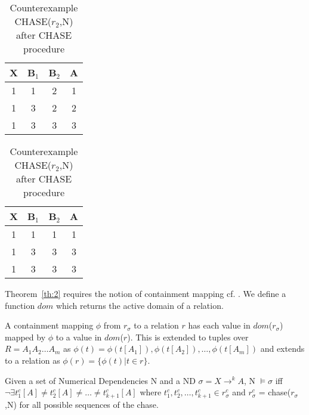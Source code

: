 {\line
\begin{table}[ht]
\begin{minipage}[b]{7cm}
\begin{center}
\begin{tabular}{|c|c|c|c|} \hline
 {\bf X} & {\bf B$_1$} & {\bf B$_2$} & {\bf A} \\\hline
 1 & 1 & 2 & 1 \\ 
 1 & 3 & 2 & 2 \\ 
 1 & 3 & 3 & 3 \\ \hline
\end{tabular}
\end{center}
\caption{\label{tbl:NDchase2}Example CHASE($r_1$,N) after CHASE procedure} 
\end{minipage}
\hfill
\begin{minipage}[b]{7cm}
\begin{center}
\begin{tabular}{|c|c|c|c|} \hline
 {\bf X} & {\bf B$_1$} & {\bf B$_2$} & {\bf A} \\\hline
 1 & 1 & 1 & 1 \\ 
 1 & 3 & 3 & 3 \\ 
 1 & 3 & 3 & 3 \\ \hline
\end{tabular}
\end{center}
\caption{\label{tbl:NDchase4}Counterexample CHASE($r_2$,N) after CHASE procedure } 
\end{minipage}
\end{table}
}


Theorem~\ref{th:2} requires the notion of containment mapping
cf. \cite{atze93}.  We define a function $dom$ which
returns the active domain of a relation.

\begin{definition}\label{def:cm}
\begin{rm}
A containment mapping $\phi$ from $r_\sigma$ to a relation $r$ has
each value in $dom$($r_\sigma$) mapped by $\phi$ to a value in $dom$($r$).
This is extended to tuples over $R = A_1A_2 \ldots A_m$ as $\phi(t) =
\phi(t[A_1]),\phi(t[A_2]),\ldots, \phi(t[A_m])$ and extends to a
relation as $\phi(r) = \{ \phi(t) | t \in r \}$.
\end{rm}
\end{definition}


\begin{theorem}\label{th:2}
\begin{rm}
Given a set of Numerical Dependencies N and a ND $\sigma = X \to^k A$,
N $\models \sigma$ iff $\neg\exists t^c_1[A] \not= t^c_2[A] \not= \ldots
\not= t^c_{k+1}[A]$ where $t^c_1,t^c_2,\ldots,t^c_{k+1} \in
r_\sigma^c$ and $r_\sigma^c$ = chase($r_\sigma$,N) for all possible
sequences of the chase.
\end{rm}
\end{theorem}

